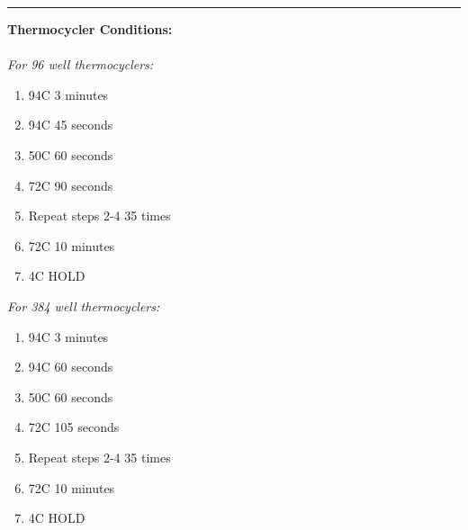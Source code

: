 \documentclass[11pt]{article}
\begin{document}
\rule{\textwidth}{1pt} %
\textbf{Thermocycler Conditions:}
\\
\\
\emph{For 96 well thermocyclers:}
\begin{enumerate}
\item 94\degree C 3 minutes
\item 94\degree C 45 seconds
\item 50\degree C 60 seconds
\item 72\degree C 90 seconds
\item Repeat steps 2-4 35 times
\item 72\degree C 10 minutes
\item 4\degree C HOLD
\end{enumerate}
\emph{For 384 well thermocyclers:}
\begin{enumerate}
\item 94\degree C 3 minutes
\item 94\degree C 60 seconds
\item 50\degree C 60 seconds
\item 72\degree C 105 seconds
\item Repeat steps 2-4 35 times
\item 72\degree C 10 minutes
\item 4\degree C HOLD
\end{enumerate}
\end{document}
